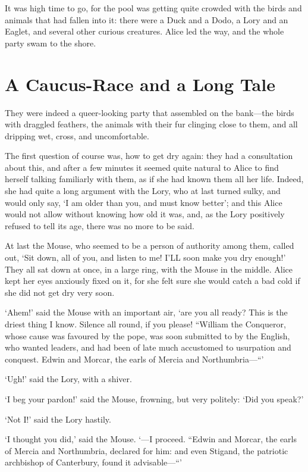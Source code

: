\documentclass[12pt]{article}
\begin{document}
\begin{Parallel}[p]{}{}
{It was high time to go, for the pool was getting quite crowded with the birds and animals that had fallen into it: there were a Duck and a Dodo, a Lory and an Eaglet, and several other curious creatures. Alice led the way, and the whole party swam to the shore.

\section{A Caucus-Race and a Long Tale}

They were indeed a queer-looking party that assembled on the bank—the birds with draggled feathers, the animals with their fur clinging close to them, and all dripping wet, cross, and uncomfortable.

The first question of course was, how to get dry again: they had a consultation about this, and after a few minutes it seemed quite natural to Alice to find herself talking familiarly with them, as if she had known them all her life. Indeed, she had quite a long argument with the Lory, who at last turned sulky, and would only say, ‘I am older than you, and must know better’; and this Alice would not allow without knowing how old it was, and, as the Lory positively refused to tell its age, there was no more to be said.

At last the Mouse, who seemed to be a person of authority among them, called out, ‘Sit down, all of you, and listen to me! I’LL soon make you dry enough!’ They all sat down at once, in a large ring, with the Mouse in the middle. Alice kept her eyes anxiously fixed on it, for she felt sure she would catch a bad cold if she did not get dry very soon.

‘Ahem!’ said the Mouse with an important air, ‘are you all ready? This is the driest thing I know. Silence all round, if you please! “William the Conqueror, whose cause was favoured by the pope, was soon submitted to by the English, who wanted leaders, and had been of late much accustomed to usurpation and conquest. Edwin and Morcar, the earls of Mercia and Northumbria—“’

‘Ugh!’ said the Lory, with a shiver.

‘I beg your pardon!’ said the Mouse, frowning, but very politely: ‘Did you speak?’

‘Not I!’ said the Lory hastily.

‘I thought you did,’ said the Mouse. ‘—I proceed. “Edwin and Morcar, the earls of Mercia and Northumbria, declared for him: and even Stigand, the patriotic archbishop of Canterbury, found it advisable—“’

}
\end{Parallel}
\end{document}
